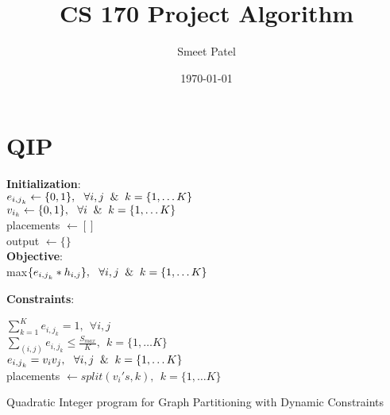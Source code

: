 \documentclass[13pt, letterpaper]{article}
\title{CS 170 Project Algorithm}
\author{Smeet Patel}
\date{\today}
\begin{document}
{\let\newpage\relax\maketitle} 
\maketitle


\section{QIP}
\begin{algorithm}[H]

\SetAlgoLined
{}
 \vspace*{.1cm}
 \vspace*{.1cm}
 \textbf{Initialization}: \\
 $e_{{i,j}_k} \leftarrow \{0,1\}, \ \  \forall i,j \And k = \{1, \dots K\} $\\
 $v_{i_{k}} \leftarrow \{0,1\}, \ \ \forall i \And k = \{1, \dots K\}$\\ 
 placements $\leftarrow \left[ \right]$ \\
 output $\leftarrow \{\}$\\
  \vspace*{.1cm}
 \textbf{Objective}: \\
 max$\{e_{{i,j}_{k}} * h_{i,j}\}, \ \ \forall i,j \And k = \{1, \dots K\}$
  \vspace*{.1cm}

 \textbf{Constraints}: 
 \vspace*{.1cm}

$\sum_{k = 1}^{K} e_{{i,j}_{k}} = 1, \ \  \forall i,j $ \\
$\sum_{(i,j)} e_{{i,j}_{k}} \leq \frac{S_{max}}{K}, \ \ k = \{1, \dots K\}$\\
$e_{{i,j}_{k}} = v_{i}v_{j}, \ \ \forall i,j \And k = \{1, \dots K\}$\\
placements $\leftarrow \textit{split}(v_{i}'s, k), \ \ k = \{1, \dots K\}$\\





 \caption{Quadratic Integer program for Graph Partitioning with Dynamic Constraints}
\end{algorithm}
\end{document}
